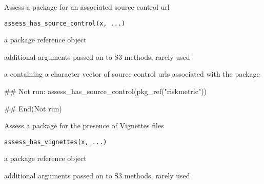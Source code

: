 \documentclass[a4paper]{book}
\begin{document}
%
\begin{Description}
Assess a package for an associated source control url
\end{Description}
%
\begin{Usage}
\begin{verbatim}
assess_has_source_control(x, ...)
\end{verbatim}
\end{Usage}
%
\begin{Arguments}
\begin{ldescription}
\item[\code{x}] a  package reference object

\item[\code{...}] additional arguments passed on to S3 methods, rarely used
\end{ldescription}
\end{Arguments}
%
\begin{Value}
a  containing a character vector of source control urls associated with the package
\end{Value}
%
\begin{SeeAlso}
\end{SeeAlso}
%
\begin{Examples}
\begin{ExampleCode}
## Not run: 
assess_has_source_control(pkg_ref("riskmetric"))

## End(Not run)
\end{ExampleCode}
\end{Examples}
%
\begin{Description}
Assess a package for the presence of Vignettes files
\end{Description}
%
\begin{Usage}
\begin{verbatim}
assess_has_vignettes(x, ...)
\end{verbatim}
\end{Usage}
%
\begin{Arguments}
\begin{ldescription}
\item[\code{x}] a  package reference object

\item[\code{...}] additional arguments passed on to S3 methods, rarely used
\end{ldescription}
\end{Arguments}
\end{document}
